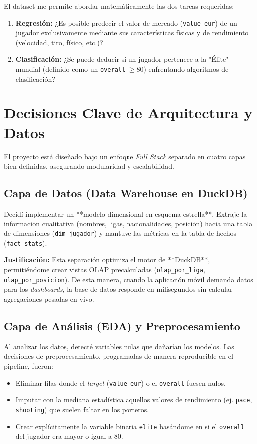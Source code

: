 \documentclass[12pt,letterpaper]{article}
\begin{document}
El dataset me permite abordar matemáticamente las dos tareas requeridas:
\begin{enumerate}
    \item \textbf{Regresión:} ¿Es posible predecir el valor de mercado (\texttt{value\_eur}) de un jugador exclusivamente mediante sus características físicas y de rendimiento (velocidad, tiro, físico, etc.)?
    \item \textbf{Clasificación:} ¿Se puede deducir si un jugador pertenece a la "Élite" mundial (definido como un \texttt{overall} $\ge 80$) enfrentando algoritmos de clasificación?
\end{enumerate}

\section{Decisiones Clave de Arquitectura y Datos}

El proyecto está diseñado bajo un enfoque \textit{Full Stack} separado en cuatro capas bien definidas, asegurando modularidad y escalabilidad.

\subsection{Capa de Datos (Data Warehouse en DuckDB)}
Decidí implementar un **modelo dimensional en esquema estrella**. 
Extraje la información cualitativa (nombres, ligas, nacionalidades, posición) hacia una tabla de dimensiones (\texttt{dim\_jugador}) y mantuve las métricas en la tabla de hechos (\texttt{fact\_stats}). 

\textbf{Justificación:} Esta separación optimiza el motor de **DuckDB**, permitiéndome crear vistas OLAP precalculadas (\texttt{olap\_por\_liga}, \texttt{olap\_por\_posicion}). De esta manera, cuando la aplicación móvil demanda datos para los \textit{dashboards}, la base de datos responde en milisegundos sin calcular agregaciones pesadas en vivo.

\subsection{Capa de Análisis (EDA) y Preprocesamiento}
Al analizar los datos, detecté variables nulas que dañarían los modelos. 
Las decisiones de preprocesamiento, programadas de manera reproducible en el pipeline, fueron:
\begin{itemize}
    \item Eliminar filas donde el \textit{target} (\texttt{value\_eur}) o el \texttt{overall} fuesen nulos.
    \item Imputar con la mediana estadística aquellos valores de rendimiento (ej. \texttt{pace}, \texttt{shooting}) que suelen faltar en los porteros.
    \item Crear explícitamente la variable binaria \texttt{elite} basándome en si el \texttt{overall} del jugador era mayor o igual a 80.
\end{itemize}
\end{document}
